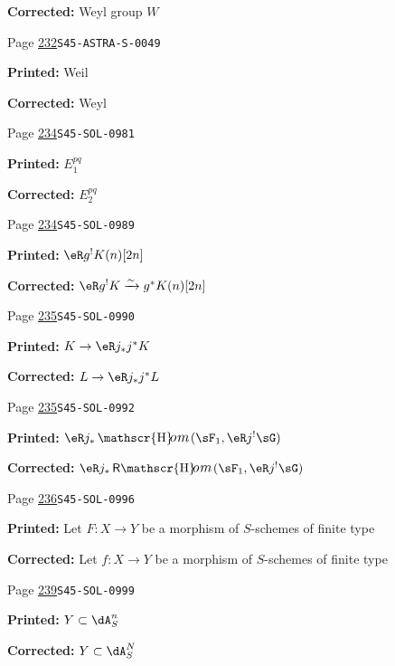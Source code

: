 \documentclass[oneside]{book}
\providecommand\calligra{\itshape}}
\DeclareMathOperator{\Hom}{\mathscr{H}\text{\kern -3pt {\calligra\large om}}\,} %
\DeclareMathOperator{\rHom}{\mathsf{R}\vspace{-1pt}\mathscr{H}\text{\kern -3pt {\calligra\large om}}\,}
\newcommand{\iso}{\xrightarrow\sim}
\theoremstyle{sga-source}
\theoremstyle{sga-source-dash}
\theoremstyle{sga-source-dotdash}
\theoremstyle{sga-source-number-note-dash}
\theoremstyle{sga-source-note-number-dotdash}
\theoremstyle{sga-source-example-dotdash}
\theoremstyle{sga-source-inline-number}
\theoremstyle{sga-source-bare-number}
\theoremstyle{sga-source}
\begin{document}
\begin{description}
\par\noindent\textbf{Corrected:} Weyl group $W$
\smallskip
\item[\hypertarget{apparatus:EN-0168}{168}] Page \hyperlink{printpage:en:232}{232}\quad\texttt{S45-ASTRA-S-0049}
\par\noindent\textbf{Printed:} Weil
\par\noindent\textbf{Corrected:} Weyl
\smallskip
\item[\hypertarget{apparatus:EN-0169}{169}] Page \hyperlink{printpage:en:234}{234}\quad\texttt{S45-SOL-0981}
\par\noindent\textbf{Printed:} \(E_1^{p q}\)
\par\noindent\textbf{Corrected:} \(E_2^{p q}\)
\smallskip
\item[\hypertarget{apparatus:EN-0170}{170}] Page \hyperlink{printpage:en:234}{234}\quad\texttt{S45-SOL-0989}
\par\noindent\textbf{Printed:} \(\eR g^! K(n)[2 n]\)
\par\noindent\textbf{Corrected:} \(\eR g^! K \iso g^\ast K(n)[2 n]\)
\smallskip
\item[\hypertarget{apparatus:EN-0171}{171}] Page \hyperlink{printpage:en:235}{235}\quad\texttt{S45-SOL-0990}
\par\noindent\textbf{Printed:} \(K\to \eR j_\ast j^\ast K\)
\par\noindent\textbf{Corrected:} \(L\to \eR j_\ast j^\ast L\)
\smallskip
\item[\hypertarget{apparatus:EN-0172}{172}] Page \hyperlink{printpage:en:235}{235}\quad\texttt{S45-SOL-0992}
\par\noindent\textbf{Printed:} \(\eR j_\ast \Hom(\sF_1,\eR j^! \sG)\)
\par\noindent\textbf{Corrected:} \(\eR j_\ast \rHom(\sF_1,\eR j^! \sG)\)
\smallskip
\item[\hypertarget{apparatus:EN-0173}{173}] Page \hyperlink{printpage:en:236}{236}\quad\texttt{S45-SOL-0996}
\par\noindent\textbf{Printed:} Let $F:X\to Y$ be a morphism of $S$-schemes of finite type
\par\noindent\textbf{Corrected:} Let $f:X\to Y$ be a morphism of $S$-schemes of finite type
\smallskip
\item[\hypertarget{apparatus:EN-0174}{174}] Page \hyperlink{printpage:en:239}{239}\quad\texttt{S45-SOL-0999}
\par\noindent\textbf{Printed:} \(Y\subset \dA_S^n\)
\par\noindent\textbf{Corrected:} \(Y\subset \dA_S^N\)

\end{description}
\end{document}
